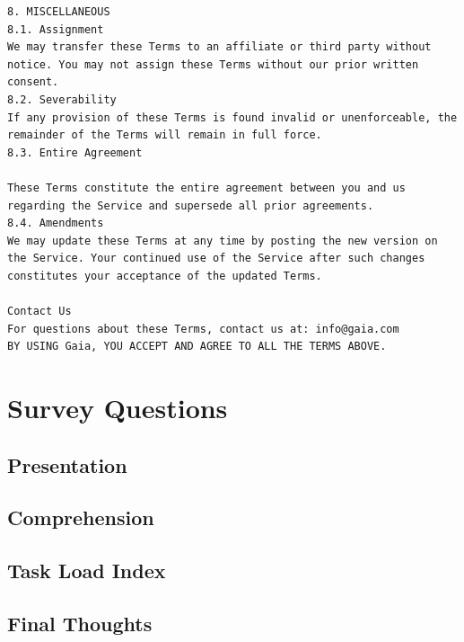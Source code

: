 \documentclass[manuscript,review,anonymous]{acmart}
\begin{document}
\begin{lstlisting}[frame=single,upquote=false,breaklines=true,columns=fullflexible,columns=fullflexible,columns=fullflexible,breakindent=0pt,basicstyle=\ttfamily\small]
8. MISCELLANEOUS
8.1. Assignment
We may transfer these Terms to an affiliate or third party without notice. You may not assign these Terms without our prior written consent.
8.2. Severability
If any provision of these Terms is found invalid or unenforceable, the remainder of the Terms will remain in full force.
8.3. Entire Agreement

These Terms constitute the entire agreement between you and us regarding the Service and supersede all prior agreements.
8.4. Amendments
We may update these Terms at any time by posting the new version on the Service. Your continued use of the Service after such changes constitutes your acceptance of the updated Terms.

Contact Us
For questions about these Terms, contact us at: info@gaia.com
BY USING Gaia, YOU ACCEPT AND AGREE TO ALL THE TERMS ABOVE.
\end{lstlisting}

\section{Survey Questions}

\subsection{Presentation}
	\begin{table}[!h]
		\centering
		\caption{Question Presentation}
		\label{tab:presentation}
		
	\end{table}

\subsection{Comprehension}
	\begin{table}[!h]
		\centering
		\caption{Question Comprehension}
		\label{tab:comprehension}
		
	\end{table}
\subsection{Task Load Index}
	\begin{table}[!h]
		\centering
		\caption{Question Task Load Index}
		\label{tab:TLX}
		
	\end{table}

	\subsection{Final Thoughts}
	\begin{table}[!h]
		\centering
		\caption{Question Final Thoughts}
		\label{tab:finalthoughts}
		
	\end{table}
\end{document}
